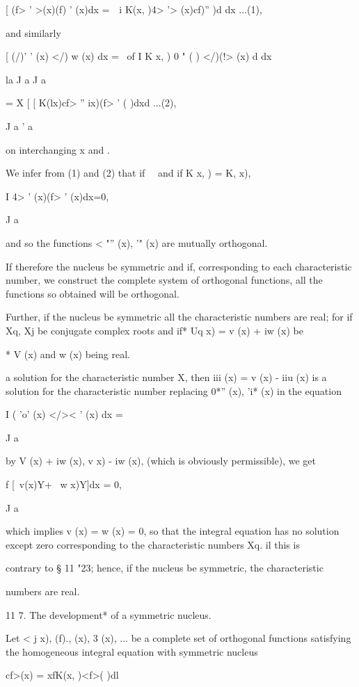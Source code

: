 {[ (f> ' >(x)(f) ' (x)dx = \,\ i K(x, )4> '> (x)cf)'' )d dx ...(1),

and similarly

[ (/)' ' (x) </) w (x) dx = \ of I K x, ) 0 " ( ) </)(!> (x) d dx

la J a J a

= X [ [ K(lx)cf> '' ix)(f> ' ( )dxd ...(2),

J a ' a

on interchanging x and .

We infer from (1) and (2) that if \ \ and if K x, ) = K, x),

I 4> ' (x)(f> ' (x)dx=0,

J a

and so the functions < "'' (x), '" (x) are mutually orthogonal.

If therefore the nucleus be symmetric and if, corresponding to each
characteristic number, we construct the complete system of orthogonal
functions, all the functions so obtained will be orthogonal.

Further, if the nucleus be symmetric all the characteristic numbers
are real; for if Xq, Xj be conjugate complex roots and if* Uq x) = v
(x) + iw (x) be

* V (x) and w (x) being real.

%
%

a solution for the characteristic number X, then iii (x) = v (x) -
iiu (x) is a solution for the characteristic number \; replacing 0*''
(x), 'i* (x) in the equation

I ( 'o' (x) </>< ' (x) dx =

J a

by V (x) + iw (x), v x) - iw (x), (which is obviously permissible), we
get

f [\ v(x)Y+ \ w x)Y]dx = 0,

J a

which implies v (x) = w (x) = 0, so that the integral equation has no
solution except zero corresponding to the characteristic numbers Xq.
il this is

contrary to § 11 "23; hence, if the nucleus be symmetric, the
characteristic

numbers are real.

11 7. The development* of a symmetric nucleus.

Let < j x), (f)., (x), 3 (x), ... be a complete set of orthogonal
functions satisfying the homogeneous integral equation with symmetric
nucleus

cf>(x) = xfK(x, )<f>( )dl

}
